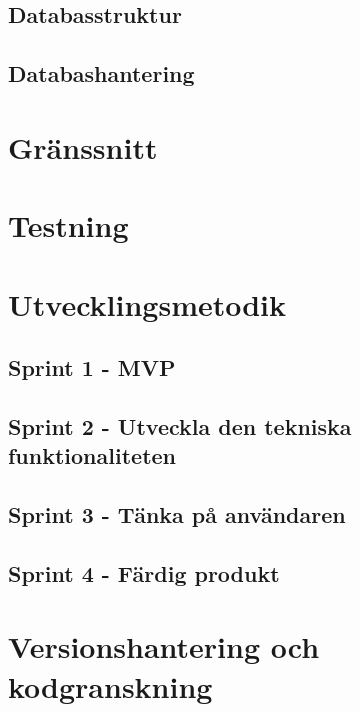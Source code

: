 \subsection{Databasstruktur}
\label{ssec:activerec}

\subsection{Databashantering}

\section{Gränssnitt}

\section{Testning}

\section{Utvecklingsmetodik}

\subsection{Sprint 1 - MVP}

\subsection{Sprint 2 - Utveckla den tekniska funktionaliteten}

\subsection{Sprint 3 - Tänka på användaren}

\subsection{Sprint 4 - Färdig produkt}

\section{Versionshantering och kodgranskning}
